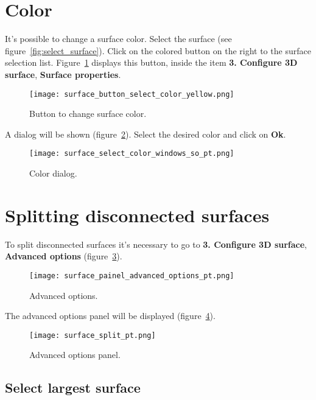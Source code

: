 \newpage

\section{Color}

It's possible to change a surface color. Select the surface (see figure~\ref{fig:select_surface}). Click on the colored button on the right to the surface selection list. Figure~\ref{fig:change_surface_color} displays this button, inside the item \textbf{3. Configure 3D surface}, \textbf{Surface properties}.

\begin{figure}[!htb]
\centering
\texttt{[image: surface\_button\_select\_color\_yellow.png]}
\caption{Button to change surface color.}
\label{fig:change_surface_color}
\end{figure}

A dialog will be shown (figure~\ref{fig:button_select_color}). Select the desired color and click on \textbf{Ok}.

\begin{figure}[!htb]
\centering
\texttt{[image: surface\_select\_color\_windows\_so\_pt.png]}
\caption{Color dialog.}
\label{fig:button_select_color}
\end{figure}

\section{Splitting disconnected surfaces}

To split disconnected surfaces it's necessary to go to \textbf{3. Configure 3D surface}, \textbf{Advanced options} (figure~\ref{fig:advanced_tools}).

\begin{figure}[!htb]
\centering
\texttt{[image: surface\_painel\_advanced\_options\_pt.png]}
\caption{Advanced options.}
\label{fig:advanced_tools}
\end{figure}

\newpage

The advanced options panel will be displayed (figure~\ref{fig:advanced_tools_expanded}).

\begin{figure}[!htb]
\centering
\texttt{[image: surface\_split\_pt.png]}
\caption{Advanced options panel.}
\label{fig:advanced_tools_expanded}
\end{figure}

\subsection{Select largest surface}

